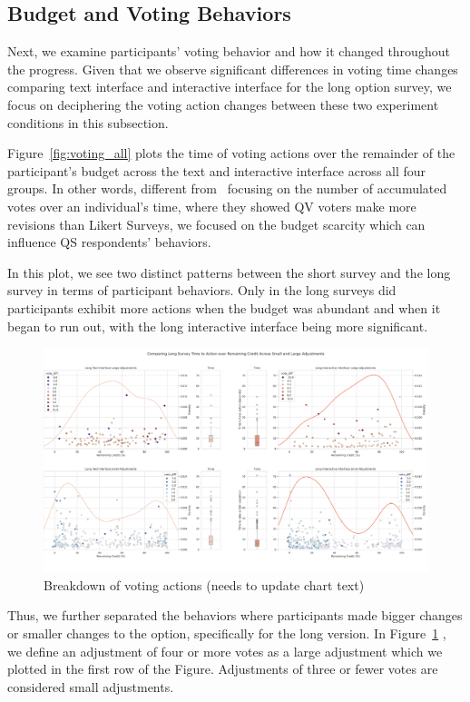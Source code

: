 \subsection{Budget and Voting Behaviors}
Next, we examine participants' voting behavior and how it changed throughout the progress. Given that we observe significant differences in voting time changes comparing text interface and interactive interface for the long option survey, we focus on deciphering the voting action changes between these two experiment conditions in this subsection.

Figure~\ref{fig:voting_all} plots the time of voting actions over the remainder of the participant's budget across the text and interactive interface across all four groups. In other words, different from~\textcite{quarfoot2017quadratic} focusing on the number of accumulated votes over an individual's time, where they showed QV voters make more revisions than Likert Surveys, we focused on the budget scarcity which can influence QS respondents' behaviors.

In this plot, we see two distinct patterns between the short survey and the long survey in terms of participant behaviors. Only in the long surveys did participants exhibit more actions when the budget was abundant and when it began to run out, with the long interactive interface being more significant.

\begin{figure}[ht]
    \centering
    \includegraphics[width=\textwidth]{content/image/results/combined_density_plots.pdf}
    \caption{Breakdown of voting actions (needs to update chart text)}
    \label{fig:voting_v3_v4}
\end{figure}

Thus, we further separated the behaviors where participants made bigger changes or smaller changes to the option, specifically for the long version. In Figure~\ref{fig:voting_v3_v4} , we define an adjustment of four or more votes as a large adjustment which we plotted in the first row of the Figure. Adjustments of three or fewer votes are considered small adjustments.

